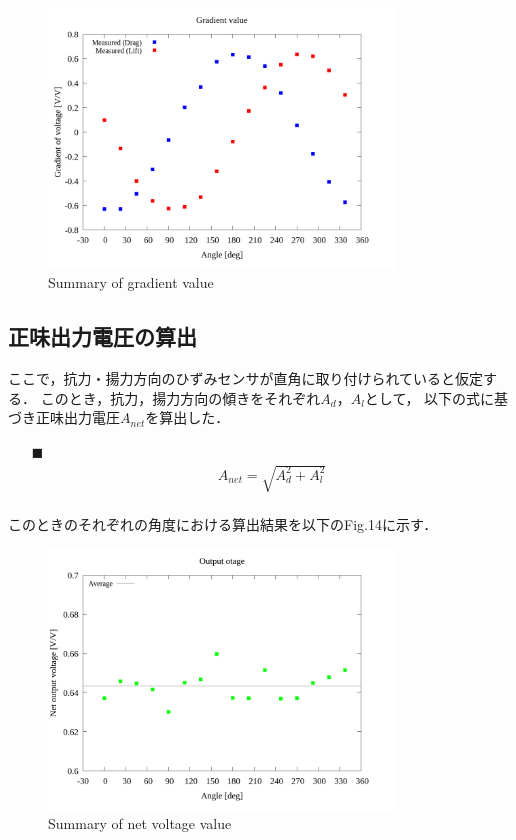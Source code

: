 \documentclass[twocolumn,a4j]{jsarticle}
\begin{document}
\begin{figure}[htbp]
    \footnotesize
    \begin{center}
        \includegraphics[width=92mm]{../images_2/05/05_summary-wave.png}
        \caption{Summary of gradient value}
    \end{center}
\end{figure}

\subsection{正味出力電圧の算出}
ここで，抗力・揚力方向のひずみセンサが直角に取り付けられていると仮定する．
このとき，抗力，揚力方向の傾きをそれぞれ$A_d$，$A_l$として，
以下の式に基づき正味出力電圧$A_{net}$を算出した．

\begin{itemize}
    \item [$\blacksquare$] 
    \begin{eqnarray*}
        A_{net} = \sqrt{A_d^2 + A_l^2}\\
    \end{eqnarray*}
\end{itemize}

このときのそれぞれの角度における算出結果を以下のFig.14に示す．

\begin{figure}[htbp]
        \footnotesize
            \begin{center}
        \includegraphics[width=92mm]{../images_2/05/05_summary-outputvoltage.png}
        \caption{Summary of net voltage value}
    \end{center}
\end{figure}
\end{document}
